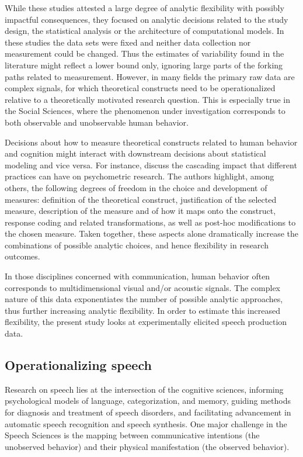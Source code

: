 \documentclass[Review,times,sageh]{sagej}
\begin{document}
While these studies attested a large degree of analytic flexibility with possibly impactful consequences, they focused on analytic decisions related to the study design, the statistical analysis or the architecture of computational models.
In these studies the data sets were fixed and neither data collection nor measurement could be changed.
Thus the estimates of variability found in the literature might reflect a lower bound only, ignoring large parts of the forking paths related to measurement.
However, in many fields the primary raw data are complex signals, for which theoretical constructs need to be operationalized relative to a theoretically motivated research question.
This is especially true in the Social Sciences, where the phenomenon under investigation corresponds to both observable and unobservable human behavior.

Decisions about how to measure theoretical constructs related to human behavior and cognition might interact with downstream decisions about statistical modeling and vice versa.
For instance, \citet{flake2020} discuss the cascading impact that different practices can have on psychometric research.
The authors highlight, among others, the following degrees of freedom in the choice and development of measures: definition of the theoretical construct, justification of the selected measure, description of the measure and of how it maps onto the construct, response coding and related transformations, as well as post-hoc modifications to the chosen measure.
Taken together, these aspects alone dramatically increase the combinations of possible analytic choices, and hence flexibility in research outcomes.

In those disciplines concerned with communication, human behavior often corresponds to multidimensional visual and/or acoustic signals.
The complex nature of this data exponentiates the number of possible analytic approaches, thus further increasing analytic flexibility.
In order to estimate this increased flexibility, the present study looks at experimentally elicited speech production data.\\

\hypertarget{s:operspeech}{%
\subsection{Operationalizing speech}\label{s:operspeech}}

Research on speech lies at the intersection of the cognitive sciences, informing psychological models of language, categorization, and memory, guiding methods for diagnosis and treatment of speech disorders, and facilitating advancement in automatic speech recognition and speech synthesis.
One major challenge in the Speech Sciences is the mapping between communicative intentions (the unobserved behavior) and their physical manifestation (the observed behavior).
\end{document}
